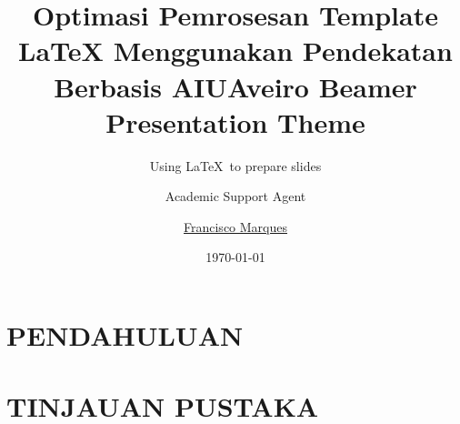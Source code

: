 \documentclass{beamer}
\title{Optimasi Pemrosesan Template LaTeX Menggunakan Pendekatan Berbasis AI}
\author{Academic Support Agent}
\date{\today}
\begin{document}
\maketitle

\begin{abstract}

\end{abstract}

\chapter{PENDAHULUAN}


\chapter{TINJAUAN PUSTAKA}


\usepackage{amsfonts,amsmath,oldgerm}

\newcommand{\testcolor}[1]{\colorbox{#1}{\textcolor{#1}{test}}~\texttt{#1}}



\newcommand{\hrefcol}[2]{\textcolor{cyan}{\href{#1}{#2}}}

\title{UAveiro Beamer Presentation Theme}
\subtitle{Using \LaTeX\ to prepare slides}
\author{\href{mailto:user.name@domain.com}{Francisco Marques}}
\end{document}

